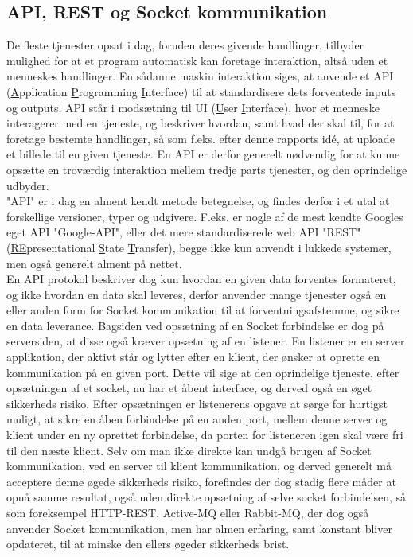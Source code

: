 \subsection{API, REST og Socket kommunikation}
\label{API}
De fleste tjenester opsat i dag, foruden deres givende handlinger, tilbyder mulighed for at et program automatisk kan foretage interaktion, altså uden et menneskes handlinger. En sådanne maskin interaktion siges, at anvende et API (\underline{A}pplication \underline{P}rogramming \underline{I}nterface) til at standardisere dets forventede inputs og outputs. 
API står i modsætning til UI (\underline{U}ser \underline{I}nterface), hvor et menneske interagerer med en tjeneste, og beskriver hvordan, samt hvad der skal til, for at foretage bestemte handlinger, så som f.eks. efter denne rapports idé, at uploade et billede til en given tjeneste. En API er derfor generelt nødvendig for at kunne opsætte en troværdig interaktion mellem tredje parts tjenester, og den oprindelige udbyder.\cite{WhatIsAPI}\\
"API" er i dag en alment kendt metode betegnelse, og findes derfor i et utal at forskellige versioner, typer og udgivere. F.eks. er nogle af de mest kendte Googles eget API "Google-API", eller det mere standardiserede web API "REST" (\underline{RE}presentational \underline{S}tate \underline{T}ransfer), begge ikke kun anvendt i lukkede systemer, men også generelt alment på nettet.\cite{codecademy_REST}\\
En API protokol beskriver dog kun hvordan en given data forventes formateret, og ikke hvordan en data skal leveres, derfor anvender mange tjenester også en eller anden form for Socket kommunikation til at forventningsafstemme, og sikre en data leverance. Bagsiden ved opsætning af en Socket forbindelse er dog på serversiden, at disse også kræver opsætning af en listener. En listener er en server applikation, der aktivt står og lytter efter en klient, der ønsker at oprette en kommunikation på en given port. Dette vil sige at den oprindelige tjeneste, efter opsætningen af et socket, nu har et åbent interface, og derved også en øget sikkerheds risiko. Efter opsætningen er listenerens opgave at sørge for hurtigst muligt, at sikre en åben forbindelse på en anden port, mellem denne server og klient under en ny oprettet forbindelse, da porten for listeneren igen skal være fri til den næste klient. \cite{WhatIsSocket} Selv om man ikke direkte kan undgå brugen af Socket kommunikation, ved en server til klient kommunikation, og derved generelt må acceptere denne øgede sikkerheds risiko, forefindes der dog stadig flere måder at opnå samme resultat, også uden direkte opsætning af selve socket forbindelsen, så som foreksempel HTTP-REST, Active-MQ eller Rabbit-MQ, der dog også anvender Socket kommunikation, men har almen erfaring, samt konstant bliver opdateret, til at minske den ellers øgeder sikkerheds brist.\cite{SocketAlternatives}
\newpage
